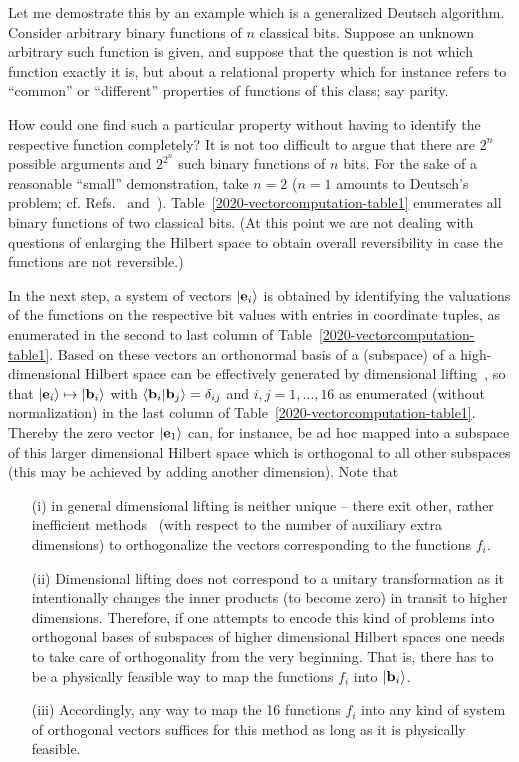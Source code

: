 \documentclass{ws-procs9x6}
\begin{document}
Let me demostrate this by an example which is a generalized Deutsch algorithm.
Consider arbitrary binary functions of $n$ classical bits.
Suppose an unknown arbitrary such function is given, and suppose that the question is not which function exactly it is,
but about a relational property which for instance refers to ``common'' or ``different'' properties of functions of this class; say parity.

How could one find such a particular property without having to identify the respective function completely?
It is not too difficult to argue that there are $2^n$ possible arguments and $2^{2^n}$ such binary functions of $n$ bits.
For the sake of a reasonable ``small'' demonstration, take $n=2$
($n=1$ amounts to Deutsch's problem; cf. Refs.~\cite[Section~2.2]{mermin-07} and~\cite[Section~1.4.3]{nielsen-book10}).
Table~\ref{2020-vectorcomputation-table1} enumerates all binary functions of two classical bits.
(At this point we are not dealing with questions of enlarging the Hilbert space to obtain overall reversibility in case the functions are not reversible.)



In the next step, a system of vectors $\vert {\bf e}_i \rangle$
is obtained by identifying the valuations of the functions on the respective bit values with entries in coordinate tuples,
as enumerated in the second to last column of Table~\ref{2020-vectorcomputation-table1}.
Based on these vectors an orthonormal basis of a (subspace) of a high-dimensional Hilbert space can
be effectively generated by dimensional lifting~\cite{svozil-2016-ggs}, so that
$\vert {\bf e}_i    \rangle \mapsto \vert {\bf b}_i    \rangle$ with $\langle  {\bf b}_i    \vert {\bf b}_j    \rangle =\delta_{ij}$ and $i,j=1,\ldots ,16$
as enumerated (without normalization) in the last column of Table~\ref{2020-vectorcomputation-table1}.
Thereby the zero vector $\vert {\bf e}_1    \rangle$ can, for instance, be ad hoc mapped into a
subspace of this larger dimensional Hilbert space which is orthogonal to all other subspaces
(this may be achieved by adding another dimension).
Note that
\begin{itemize}
\item[(i)] in general dimensional lifting is neither unique --
there exit other, rather inefficient methods~\cite{svozil-2016-vector} (with respect to the number of auxiliary extra dimensions)
to orthogonalize the vectors corresponding to the functions $f_i$.
\item[(ii)] Dimensional lifting does not correspond to a unitary transformation as it intentionally changes the inner products (to become zero) in transit to higher dimensions.
Therefore, if one attempts to encode this kind of problems into orthogonal bases of subspaces of higher dimensional Hilbert spaces
one needs to take care of orthogonality from the very beginning.
That is, there has to be a physically feasible way to map the functions $f_i$ into $\vert {\bf b}_i \rangle$.
\item[(iii)]
Accordingly, any way to map the 16 functions $f_i$ into any kind of system of orthogonal vectors suffices for this method as long as it is physically feasible.
\end{itemize}
\end{document}
